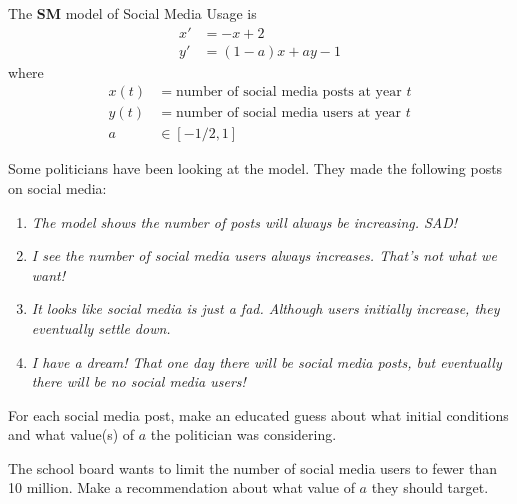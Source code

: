 \documentclass{workbook}
\begin{document}
\begin{slide}
	\question
	The \textbf{SM} model of Social Media Usage is
	\begin{align*}
		x'&=-x+2\\
		y'&=(1-a)x + ay - 1
	\end{align*}
	where
	\begin{align*}
		x(t) &= \text{number of social media posts at year $t$}\\
		y(t) &= \text{number of social media users at year $t$}\\
		a &\in [-1/2, 1]
	\end{align*}

	Some politicians have been looking at the model. They made the following posts on social media:
	\begin{enumerate}
			\item \emph{The model shows the number of posts will always be increasing. SAD!}
			\item \emph{I see the number of social media users always increases. That's not what we want!}
			\item \emph{It looks like social media is just a fad. Although users initially increase, they eventually settle down.}
			\item \emph{I have a dream! That one day there will be social media posts, but eventually there will be no social media users!}
	\end{enumerate}
		
	\begin{parts}
		\item For each social media post, make an educated guess about what initial conditions and what
		value(s) of $a$ the politician was considering.
		\item The school board wants to limit the number of social media users to fewer than 10 million.
		Make a recommendation about what value of $a$ they should target.
	\end{parts}
\end{slide}

%
%
\end{document}
